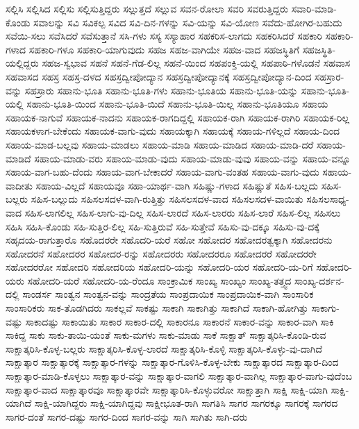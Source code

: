 {ಸಲ್ಲಿಸಿ
ಸಲ್ಲಿಸಿದ
ಸಲ್ಲಿಸು
ಸಲ್ಲಿಸುತ್ತಿದ್ದರು
ಸಲ್ಲುತ್ತದೆ
ಸಲ್ಲುವ
ಸವನ-ರೋಲಾ
ಸವರಿ
ಸವರುತ್ತಿದ್ದರು
ಸವಾರಿ-ಮಾಡಿ-ಕೊಂಡು
ಸವಾಲನ್ನು
ಸವಿ
ಸವಿಕಲ್ಪ
ಸವಿದ
ಸವಿ-ದಿನ-ಗಳನ್ನು
ಸವಿ-ಯನ್ನು
ಸವಿ-ಯೋಣ
ಸವೆದು-ಹೋಗಿರ-ಬಹುದು
ಸವೆಯಿ-ಸಲು
ಸವೆಸಿದರೆ
ಸವೆಸುತ್ತಾನೆ
ಸಸಿ-ಗಳು
ಸಸ್ಯ
ಸಸ್ಯಾಹಾರ
ಸಹಕರಿಸ-ಲಾಗದು
ಸಹಕರಿಸಿದರೆ
ಸಹಕಾರಿ
ಸಹಕಾರಿ-ಗಳಾದ
ಸಹಕಾರಿ-ಗಳೂ
ಸಹಕಾರಿ-ಯಾಗುವುದು
ಸಹಜ
ಸಹಜ-ವಾಗಿಯೇ
ಸಹಜ-ವಾದ
ಸಹಜಸ್ಥಿತಿಗೆ
ಸಹಜಸ್ಥಿತಿ-ಯಲ್ಲಿದ್ದರು
ಸಹಜ-ಸ್ವಭಾವ
ಸಹನೆ
ಸಹನೆ-ಗೆಡ-ಲಿಲ್ಲ
ಸಹನೆ-ಯಿಂದ
ಸಹಪಂಕ್ತಿ-ಯಲ್ಲಿ
ಸಹಪಾಠಿ-ಗಳೊಡನೆ
ಸಹವಾಸ
ಸಹವಾಸದ
ಸಹಸ್ರ
ಸಹಸ್ರ-ದಳದ
ಸಹಸ್ರದ್ವೀಪೋದ್ಯಾನ
ಸಹಸ್ರದ್ವೀಪೋದ್ಯಾನಕ್ಕೆ
ಸಹಸ್ರದ್ವೀಪೋದ್ಯಾನ-ದಿಂದ
ಸಹಸ್ರಾರ-ವನ್ನು
ಸಹಸ್ರಾರು
ಸಹಾನು-ಭೂತಿ
ಸಹಾನು-ಭೂತಿ-ಗಳು
ಸಹಾನು-ಭೂತಿಯ
ಸಹಾನು-ಭೂತಿ-ಯನ್ನು
ಸಹಾನು-ಭೂತಿ-ಯಲ್ಲಿ
ಸಹಾನು-ಭೂತಿ-ಯಿಂದ
ಸಹಾನು-ಭೂತಿ-ಯಿದೆ
ಸಹಾನು-ಭೂತಿ-ಯಿಲ್ಲ
ಸಹಾನು-ಭೂತಿಯೂ
ಸಹಾಯ
ಸಹಾಯಕ-ನಾಗುವೆ
ಸಹಾಯಕ-ನಾದನು
ಸಹಾಯಕ-ರಾಗದಿದ್ದಲ್ಲಿ
ಸಹಾಯಕ-ರಾಗಿ
ಸಹಾಯಕ-ರಾಗಿರಿ
ಸಹಾಯಕ-ರಿಲ್ಲ
ಸಹಾಯಕಳಾಗ-ಬೇಕೆಂದು
ಸಹಾಯಕ-ವಾಗು-ವುದು
ಸಹಾಯಕ್ಕಾಗಿ
ಸಹಾಯಕ್ಕೆ
ಸಹಾಯ-ಗಳಿಲ್ಲದೆ
ಸಹಾಯ-ದಿಂದ
ಸಹಾಯ-ಮಾಡ-ಬಲ್ಲವು
ಸಹಾಯ-ಮಾಡಲು
ಸಹಾಯ-ಮಾಡಿ
ಸಹಾಯ-ಮಾಡಿದ
ಸಹಾಯ-ಮಾಡಿ-ದರೆ
ಸಹಾಯ-ಮಾಡಿದೆ
ಸಹಾಯ-ಮಾಡು-ವರು
ಸಹಾಯ-ಮಾಡು-ವುದು
ಸಹಾಯ-ಮಾಡು-ವುವು
ಸಹಾಯ-ವನ್ನು
ಸಹಾಯ-ವನ್ನೂ
ಸಹಾಯ-ವಾಗ-ಬಹು-ದೆಂದು
ಸಹಾಯ-ವಾಗ-ಬೇಕಾದರೆ
ಸಹಾಯ-ವಾಗು-ವಂತಹ
ಸಹಾಯ-ವಾಗು-ವುದು
ಸಹಾಯ-ವಾದೀತು
ಸಹಾಯ-ವಿಲ್ಲದೆ
ಸಹಾಯವೂ
ಸಹಾ-ಯಾರ್ಥ-ವಾಗಿ
ಸಹಿಷ್ಣು-ಗಳಾದ
ಸಹಿಷ್ಣುತೆ
ಸಹಿಸ-ಬಲ್ಲದು
ಸಹಿಸ-ಬಲ್ಲರು
ಸಹಿಸ-ಬಲ್ಲುದು
ಸಹಿಸಲಸದಳ-ವಾಗಿ-ರುತ್ತಿತ್ತು
ಸಹಿಸಲಸದಳ-ವಾದ
ಸಹಿಸಲಸದಳ-ವಾಯಿತು
ಸಹಿಸಲಸಾಧ್ಯ-ವಾದ
ಸಹಿಸ-ಲಾಗಲಿಲ್ಲ
ಸಹಿಸ-ಲಾಗು-ವು-ದಿಲ್ಲ
ಸಹಿಸ-ಲಾರದೆ
ಸಹಿಸ-ಲಾರರು
ಸಹಿಸ-ಲಾರೆ
ಸಹಿಸ-ಲಿಲ್ಲ
ಸಹಿಸಲು
ಸಹಿಸಿ
ಸಹಿಸಿ-ಕೊಂಡು
ಸಹಿ-ಸುತ್ತಿರ-ಲಿಲ್ಲ
ಸಹಿ-ಸುತ್ತಿರುವೆ
ಸಹಿ-ಸುತ್ತೇವೆ
ಸಹಿಸು-ವು-ದಕ್ಕೂ
ಸಹಿಸು-ವು-ದಕ್ಕೆ
ಸಹೃದಯ-ರಾಗುತ್ತಾರೊ
ಸಹೊದರರೇ
ಸಹೊದರಿ-ಯರೆ
ಸಹೋ
ಸಹೋದರ
ಸಹೋದರತ್ವಕ್ಕಾಗಿ
ಸಹೋದರನು
ಸಹೋದರನೆ
ಸಹೋದರರ
ಸಹೋದರ-ರನ್ನು
ಸಹೋದರರು
ಸಹೋದರರೂ
ಸಹೋದರರೆ
ಸಹೋದರರೇ
ಸಹೋದರರೋ
ಸಹೋದರಿ
ಸಹೋದರಿಯ
ಸಹೋದರಿ-ಯನ್ನು
ಸಹೋದರಿ-ಯರ
ಸಹೋದರಿ-ಯ-ರಿಗೆ
ಸಹೋದರಿ-ಯರು
ಸಹೋದರಿ-ಯರೆ
ಸಹೋದರಿ-ಯ-ರೆಂದೂ
ಸಾಂಕ್ರಾಮಿಕ
ಸಾಂಖ್ಯ
ಸಾಂಖ್ಯಂ
ಸಾಂಖ್ಯ-ತತ್ತ್ವದ
ಸಾಂಖ್ಯ-ದರ್ಶನ-ದಲ್ಲಿ
ಸಾಂಡರ್ಸ
ಸಾಂತ್ವನ
ಸಾಂತ್ವನ-ವನ್ನು
ಸಾಂದ್ರತೆಯ
ಸಾಂಪ್ರದಾಯಿಕ
ಸಾಂಪ್ರದಾಯಿಕ-ವಾಗಿ
ಸಾಂಸಾರಿಕ
ಸಾಂಸಾರಿಕರು
ಸಾಕ-ತೊಡಗಿದರು
ಸಾಕಲ್ಲವೆ
ಸಾಕಷ್ಟು
ಸಾಕಾಗಿ
ಸಾಕಾಗಿತ್ತು
ಸಾಕಾಗಿದೆ
ಸಾಕಾಗಿ-ಹೋಗಿತ್ತು
ಸಾಕಾಗು-ವಷ್ಟು
ಸಾಕಾದಷ್ಟು
ಸಾಕಾಯಿತು
ಸಾಕಾರ
ಸಾಕಾರ-ದಲ್ಲಿ
ಸಾಕಾರನೂ
ಸಾಕಾರನೆ
ಸಾಕಾರ-ವನ್ನು
ಸಾಕಾರ-ವಾಗಿ
ಸಾಕಿ
ಸಾಕಿದ್ದ
ಸಾಕು
ಸಾಕು-ತಾಯಿ-ಯಂತೆ
ಸಾಕು-ಮಗಳು
ಸಾಕು-ಮಾಡು
ಸಾಕೆ
ಸಾಕ್ಷಾತ್
ಸಾಕ್ಷಾತ್ಕರಿಸಿ-ಕೊಂಡಿ-ರುವ
ಸಾಕ್ಷಾತ್ಕರಿಸಿ-ಕೊಳ್ಳ-ಬಲ್ಲರು
ಸಾಕ್ಷಾತ್ಕರಿಸಿ-ಕೊಳ್ಳ-ಲಾರದೆ
ಸಾಕ್ಷಾತ್ಕರಿಸಿ-ಕೊಳ್ಳಿ
ಸಾಕ್ಷಾತ್ಕರಿಸಿ-ಕೊಳ್ಳು-ವು-ದಾಗಿದೆ
ಸಾಕ್ಷಾತ್ಕಾರ
ಸಾಕ್ಷಾತ್ಕಾರಕ್ಕೆ
ಸಾಕ್ಷಾತ್ಕಾರ-ಗಳನ್ನು
ಸಾಕ್ಷಾತ್ಕಾರ-ಗೊಳಿಸಿ-ಕೊಳ್ಳ-ಬೇಕು
ಸಾಕ್ಷಾತ್ಕಾರದ
ಸಾಕ್ಷಾತ್ಕಾರ-ದಿಂದ
ಸಾಕ್ಷಾತ್ಕಾರ-ಮಾಡಿ-ಕೊಳ್ಳಲು
ಸಾಕ್ಷಾತ್ಕಾರ-ವನ್ನು
ಸಾಕ್ಷಾತ್ಕಾರ-ವಾಗಲಿ
ಸಾಕ್ಷಾತ್ಕಾರ-ವಾಗಿಲ್ಲ
ಸಾಕ್ಷಾತ್ಕಾರ-ವಾಗು-ವುದೆಂಬ
ಸಾಕ್ಷಾತ್ಕಾರ-ವಾದ
ಸಾಕ್ಷಾತ್ಕಾರವೂ
ಸಾಕ್ಷಾತ್ಕಾರವೇ
ಸಾಕ್ಷಾತ್ಕಾರಿಸಿ-ಕೊಳ್ಳುವರೋ
ಸಾಕ್ಷಾತ್ತಾಗಿ
ಸಾಕ್ಷಿ
ಸಾಕ್ಷಿ-ಯಾಗಿ
ಸಾಕ್ಷಿ-ಯಾಗಿದೆ
ಸಾಕ್ಷಿ-ಯಾಗಿದ್ದರು
ಸಾಕ್ಷಿ-ಯಾಗಿದ್ದವು
ಸಾಕ್ಷೀಭೂತ-ರಾಗಿ
ಸಾಗತಿಸಿ
ಸಾಗರ
ಸಾಗರಕ್ಕೂ
ಸಾಗರಕ್ಕೆ
ಸಾಗರದ
ಸಾಗರ-ದಂತೆ
ಸಾಗರ-ದಷ್ಟು
ಸಾಗರ-ದಿಂದ
ಸಾಗರ-ವನ್ನು
ಸಾಗಿ
ಸಾಗಿತು
ಸಾಗಿ-ದರು
}
